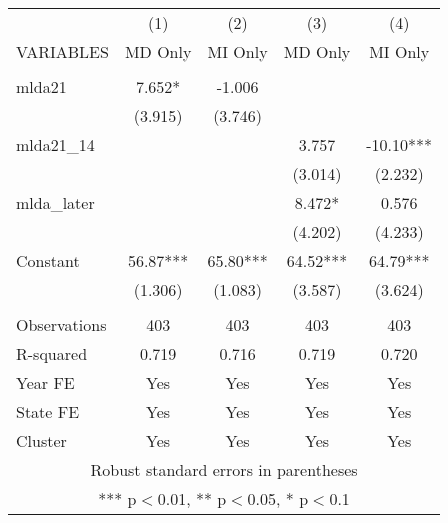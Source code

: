 \documentclass[]{article}
\begin{document}
\begin{tabular}{lcccc} \hline
 & (1) & (2) & (3) & (4) \\
VARIABLES & MD Only & MI Only & MD Only & MI Only \\ \hline
 &  &  &  &  \\
mlda21 & 7.652* & -1.006 &  &  \\
 & (3.915) & (3.746) &  &  \\
mlda21\_14 &  &  & 3.757 & -10.10*** \\
 &  &  & (3.014) & (2.232) \\
mlda\_later &  &  & 8.472* & 0.576 \\
 &  &  & (4.202) & (4.233) \\
Constant & 56.87*** & 65.80*** & 64.52*** & 64.79*** \\
 & (1.306) & (1.083) & (3.587) & (3.624) \\
 &  &  &  &  \\
Observations & 403 & 403 & 403 & 403 \\
R-squared & 0.719 & 0.716 & 0.719 & 0.720 \\
Year FE & Yes & Yes & Yes & Yes \\
State FE & Yes & Yes & Yes & Yes \\
 Cluster & Yes & Yes & Yes & Yes \\ \hline
\multicolumn{5}{c}{ Robust standard errors in parentheses} \\
\multicolumn{5}{c}{ *** p$<$0.01, ** p$<$0.05, * p$<$0.1} \\
\end{tabular}
\end{document}
